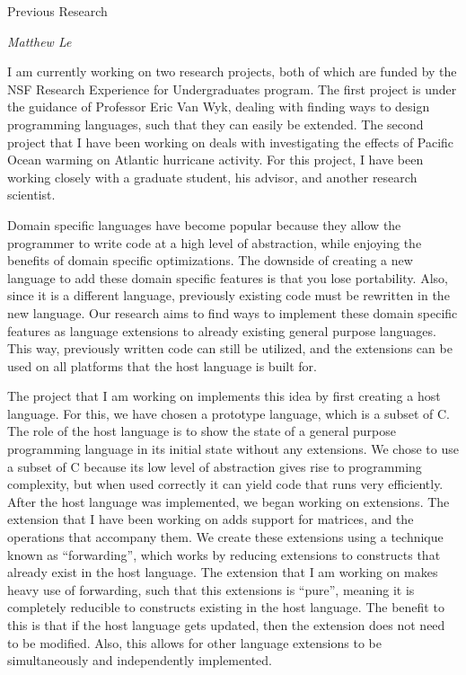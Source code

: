 \documentclass[a4paper,12pt]{article}
\begin{document}
\begin{center}
{\Large Previous Research}

\emph{Matthew Le}
\end{center}

I am currently working on two research projects, both of which are funded by the NSF Research Experience for Undergraduates program. The first project is under the guidance of Professor Eric Van Wyk, dealing with finding ways to design programming languages, such that they can easily be extended. The second project that I have been working on deals with investigating the effects of Pacific Ocean warming on Atlantic hurricane activity. For this project, I have been working closely with a graduate student, his advisor, and another research scientist.  

Domain specific languages have become popular because they allow the programmer to write code at a high level of abstraction, while enjoying the benefits of domain specific optimizations. The downside of creating a new language to add these domain specific features is that you lose portability. Also, since it is a different language, previously existing code must be rewritten in the new language. Our research aims to find ways to implement these domain specific features as language extensions to already existing general purpose languages. This way, previously written code can still be utilized, and the extensions can be used on all platforms that the host language is built for.  

The project that I am working on implements this idea by first creating a host language. For this, we have chosen a prototype language, which is a subset of C. The role of the host language is to show the state of a general purpose programming language in its initial state without any extensions.  We chose to use a subset of C because its low level of abstraction gives rise to programming complexity, but when used correctly it can yield code that runs very efficiently. After the host language was implemented, we began working on extensions. The extension that I have been working on adds support for matrices, and the operations that accompany them. We create these extensions using a technique known as ``forwarding'', which works by reducing extensions to constructs that already exist in the host language.  The extension that I am working on makes heavy use of forwarding, such that this extensions is ``pure'', meaning it is completely reducible to constructs existing in the host language.  The benefit to this is that if the host language gets updated, then the extension does not need to be modified.  Also, this allows for other language extensions to be simultaneously and independently implemented.
\end{document}

